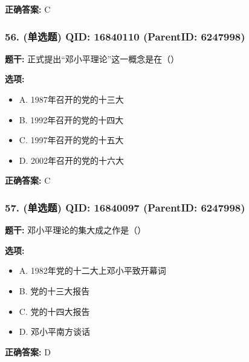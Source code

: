 \documentclass[12pt,UTF8]{ctexart}
\begin{document}
\textbf{正确答案:}
C

\vspace{0.3em}\hrulefill\vspace{0.7em}

\subsubsection*{56. (单选题) \small QID: 16840110 (ParentID: 6247998)}

\textbf{题干:}
正式提出“邓小平理论”这一概念是在（）



\textbf{选项:}
\begin{itemize}[leftmargin=*]

  \item A. 1987年召开的党的十三大

  \item B. 1992年召开的党的十四大

  \item C. 1997年召开的党的十五大

  \item D. 2002年召开的党的十六大

\end{itemize}

\textbf{正确答案:}
C

\vspace{0.3em}\hrulefill\vspace{0.7em}

\subsubsection*{57. (单选题) \small QID: 16840097 (ParentID: 6247998)}

\textbf{题干:}
邓小平理论的集大成之作是（）



\textbf{选项:}
\begin{itemize}[leftmargin=*]

  \item A. 1982年党的十二大上邓小平致开幕词

  \item B. 党的十三大报告

  \item C. 党的十四大报告

  \item D. 邓小平南方谈话

\end{itemize}

\textbf{正确答案:}
D
\end{document}
